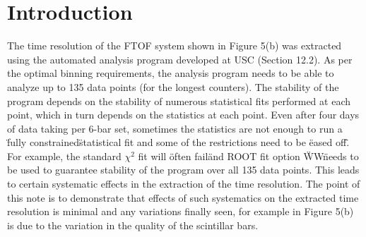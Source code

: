 \documentclass[12pt]{article}
\begin{document}
\maketitle


\section{Introduction}

The time resolution of the FTOF system shown in Figure 5(b) was extracted using the automated analysis program developed at USC (Section 12.2).  As per the optimal binning requirements, the analysis program needs to be able to analyze up to 135 data points (for the longest counters). The stability of the program depends on the stability of numerous statistical fits performed at each point, which in turn depends on the statistics at each point. Even after four days of data taking per 6-bar set, sometimes the statistics are not enough to run a \"fully constrained\" statistical fit and some of the restrictions need to be \"eased off\".  For example, the standard $\chi^{2}$ fit will \"often fail\" and ROOT fit option \"WW\" needs to be used to guarantee stability of the program over all 135 data points. This leads to certain systematic effects in the extraction of the time resolution. The point of this note is to demonstrate that effects of such systematics on the extracted time resolution is minimal and any variations finally seen, for example in Figure 5(b) is due to the variation in the quality of the scintillar bars.



\label{bib}


\end{document}
